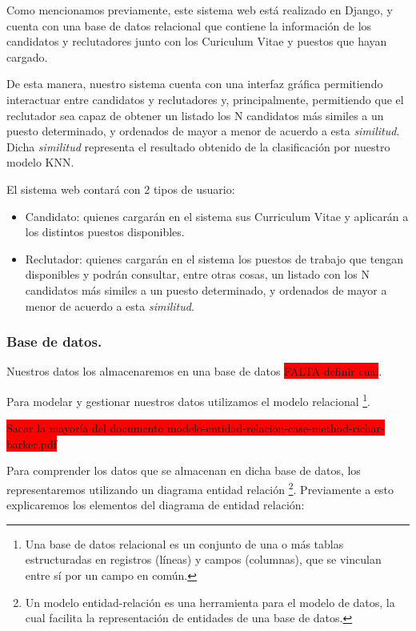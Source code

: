 \documentclass[12pt,a4paper]{article}
\begin{document}
\begin{sloppypar}
Como mencionamos previamente, este sistema web está realizado en Django, y cuenta con una base de datos relacional que contiene la información de los candidatos y reclutadores junto con los Curiculum Vitae y puestos que hayan cargado. 

De esta manera, nuestro sistema cuenta con una interfaz gráfica permitiendo interactuar entre candidatos y reclutadores y, principalmente, permitiendo que el reclutador sea capaz de obtener un listado los N candidatos más similes a un puesto determinado, y ordenados de mayor a menor de acuerdo a esta \textit{similitud}. Dicha \textit{similitud} representa el resultado obtenido de la clasificación por nuestro modelo KNN.

El sistema web contará con 2 tipos de usuario: 
\begin{itemize}
\item Candidato: quienes cargarán en el sistema sus Curriculum Vitae y aplicarán a los distintos puestos disponibles.
\item Reclutador: quienes cargarán en el sistema los puestos de trabajo que tengan disponibles y podrán consultar, entre otras cosas, un listado con los N candidatos más similes a un puesto determinado, y ordenados de mayor a menor de acuerdo a esta \textit{similitud}.
\end{itemize}

\cleardoublepage

\subsubsection{Base de datos.}

Nuestros datos los almacenaremos en una base de datos \colorbox{red}{FALTA definir cual}. 

Para modelar y gestionar nuestros datos utilizamos el modelo relacional \footnote{Una base de datos relacional es un conjunto de una o más tablas estructuradas en registros (líneas) y campos (columnas), que se vinculan entre sí por un campo en común.}.

\colorbox{red}{Sacar la mayoría del documento modelo-entidad-relacion-case-method-richar-barker.pdf} 

Para comprender los datos que se almacenan en dicha base de datos, los representaremos utilizando un diagrama entidad relación \footnote{Un modelo entidad-relación es una herramienta para el modelo de datos, la cual facilita la representación de entidades de una base de datos.}.
Previamente a esto explicaremos los elementos del diagrama de entidad relación: 


\end{sloppypar}
\end{document}
